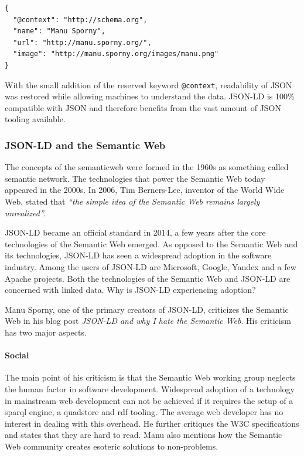 \lstset{language=JSON}
\begin{lstlisting}[caption=Compacted data of a person, label=jsonldcompacted]
{
  "@context": "http://schema.org",
  "name": "Manu Sporny",
  "url": "http://manu.sporny.org/",
  "image": "http://manu.sporny.org/images/manu.png"
}
\end{lstlisting}

With the small addition of the reserved keyword \lstinline{@context}, readability of JSON was restored while allowing machines to understand the data. JSON-LD is 100\% compatible with JSON and therefore benefits from the vast amount of JSON tooling available.


\subsubsection{JSON-LD and the Semantic Web}
The concepts of the \gls{semanticweb} were formed in the 1960s as something called semantic network. The technologies that power the Semantic Web today appeared in the 2000s. In 2006, Tim Berners-Lee, inventor of the World Wide Web, stated that \textit{``the simple idea of the Semantic Web remains largely unrealized''.} \citep{semanticwebrevisited}

JSON-LD became an official standard in 2014, a few years after the core technologies of the Semantic Web emerged. As opposed to the Semantic Web and its technologies, JSON-LD has seen a widespread adoption in the software industry. Among the users of JSON-LD are Microsoft, Google, Yandex and a few Apache projects. \citep{jsonldusers} Both the technologies of the Semantic Web and JSON-LD are concerned with linked data. Why is JSON-LD experiencing adoption?

Manu Sporny, one of the primary creators of JSON-LD, criticizes the Semantic Web in his blog post \textit{JSON-LD and why I hate the Semantic Web}. His criticism has two major aspects.

\paragraph{Social}
The main point of his criticism is that the Semantic Web working group neglects the human factor in software development. Widespread adoption of a technology in mainstream web development can not be achieved if it requires the setup of a \gls{sparql} engine, a \gls{quadstore} and \gls{rdf} tooling. The average web developer has no interest in dealing with this overhead. He further critiques the W3C specifications and states that they are hard to read. \citep{semanticwebrevisited} Manu also mentions how the Semantic Web community creates esoteric solutions to non-problems. \citep{semanticwebrevisited}


